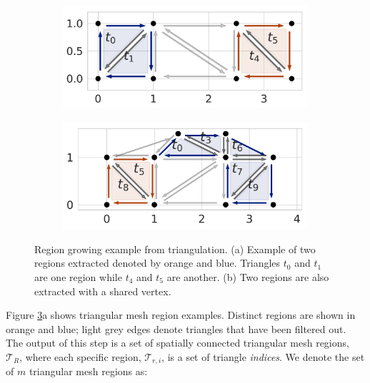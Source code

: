 \begin{figure}[ht]
    \centering
  \begin{subfigure}{.3\linewidth}
    \centering
    \includegraphics[width=0.99\linewidth]{chapter_2_polylidar/imgs/plane_extraction_a-min.pdf}
    \caption{}
    \label{fig:ch2_plane_extraction_a}
  \end{subfigure}
  \begin{subfigure}{.3\linewidth}
    \centering
    \includegraphics[width=.99\linewidth]{chapter_2_polylidar/imgs/plane_extraction_b-min.pdf}
    \caption{}
    \label{fig:ch2_plane_extraction_b}
  \end{subfigure}
  \caption[Region growing example from triangulation]{Region growing example from triangulation. (a) Example of two regions extracted denoted by orange and blue. Triangles $t_0$ and $t_1$ are one region while $t_4$ and $t_5$ are another. (b) Two regions are also extracted with a shared vertex.}
  \label{fig:ch2_plane_extraction} 
\end{figure}


 Figure \ref{fig:ch2_plane_extraction}a shows triangular mesh region examples. Distinct regions are shown in orange and blue; light grey edges denote triangles that have been filtered out.  
 The output of this step is a set of spatially connected triangular mesh regions, $\mathcal{T}_R$, where each specific region, $\mathcal{T}_{r,i}$, is a set of triangle \emph{indices}. We denote the set of $m$ triangular mesh regions as:

